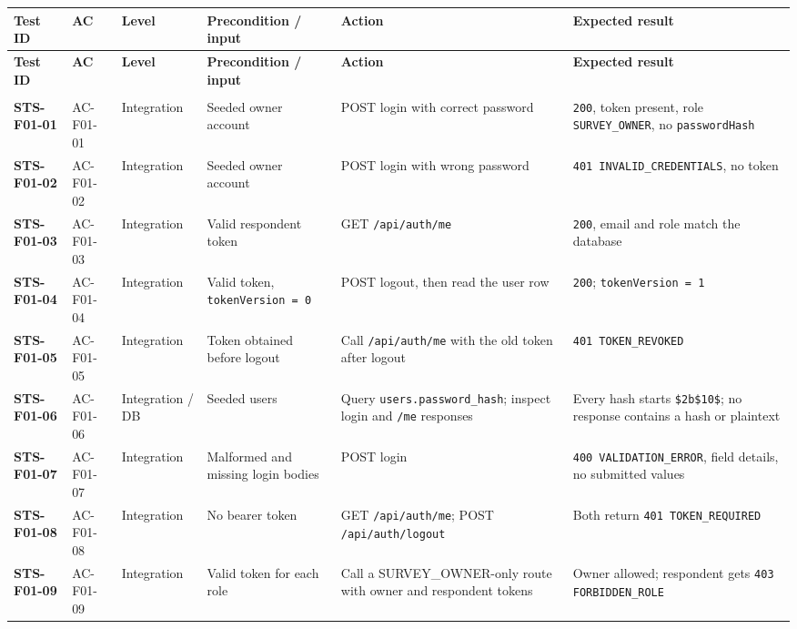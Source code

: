 \documentclass[12pt,a4paper]{article}
\begin{document}
{\setlength{\tabcolsep}{3pt}\renewcommand{\arraystretch}{1.08}\scriptsize
\begin{longtable}{@{}>{\raggedright\arraybackslash}p{}>{\raggedright\arraybackslash}p{}>{\raggedright\arraybackslash}p{}>{\raggedright\arraybackslash}p{}>{\raggedright\arraybackslash}p{}>{\raggedright\arraybackslash}p{}@{}}
\toprule
\textbf{Test ID} & \textbf{AC} & \textbf{Level} & \textbf{Precondition / input} & \textbf{Action} & \textbf{Expected result} \\
\midrule
\endfirsthead
\toprule
\textbf{Test ID} & \textbf{AC} & \textbf{Level} & \textbf{Precondition / input} & \textbf{Action} & \textbf{Expected result} \\
\midrule
\endhead
\midrule
\multicolumn{6}{r}{\footnotesize\textit{Continued on next page}}\\
\endfoot
\bottomrule
\endlastfoot
\textbf{STS-F01-01} & AC-F01-01 & Integration & Seeded owner account & POST login with correct password & \texttt{200}, token present, role \texttt{SURVEY\_OWNER}, no \texttt{passwordHash} \\
\textbf{STS-F01-02} & AC-F01-02 & Integration & Seeded owner account & POST login with wrong password & \texttt{401 INVALID\_CREDENTIALS}, no token \\
\textbf{STS-F01-03} & AC-F01-03 & Integration & Valid respondent token & GET \texttt{/api/auth/me} & \texttt{200}, email and role match the database \\
\textbf{STS-F01-04} & AC-F01-04 & Integration & Valid token, \texttt{tokenVersion = 0} & POST logout, then read the user row & \texttt{200}; \texttt{tokenVersion = 1} \\
\textbf{STS-F01-05} & AC-F01-05 & Integration & Token obtained before logout & Call \texttt{/api/auth/me} with the old token after logout & \texttt{401 TOKEN\_REVOKED} \\
\textbf{STS-F01-06} & AC-F01-06 & Integration / DB & Seeded users & Query \texttt{users.password\_hash}; inspect login and \texttt{/me} responses & Every hash starts \texttt{\$2b\$10\$}; no response contains a hash or plaintext \\
\textbf{STS-F01-07} & AC-F01-07 & Integration & Malformed and missing login bodies & POST login & \texttt{400 VALIDATION\_ERROR}, field details, no submitted values \\
\textbf{STS-F01-08} & AC-F01-08 & Integration & No bearer token & GET \texttt{/api/auth/me}; POST \texttt{/api/auth/logout} & Both return \texttt{401 TOKEN\_REQUIRED} \\
\textbf{STS-F01-09} & AC-F01-09 & Integration & Valid token for each role & Call a SURVEY\_OWNER-only route with owner and respondent tokens & Owner allowed; respondent gets \texttt{403 FORBIDDEN\_ROLE} \\
\end{longtable}}
\end{document}
